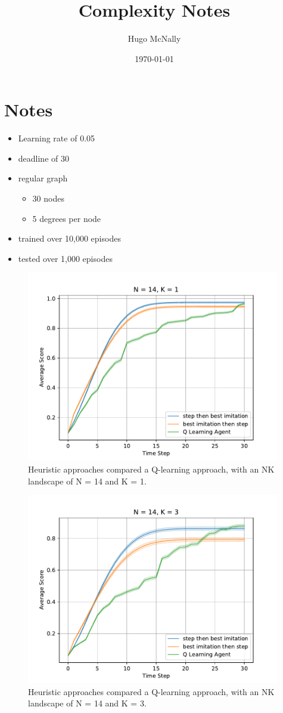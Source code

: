 \documentclass[a4paper]{article}
\title{Complexity Notes}
\date{\today}
\author{Hugo McNally}
\begin{document}
\section*{Notes}
\begin{itemize}
    \item Learning rate of 0.05
    \item deadline of 30
    \item regular graph
    \begin{itemize}
        \item 30 nodes
        \item 5 degrees per node
    \end{itemize}
    \item trained over 10,000 episodes
    \item tested over 1,000 episodes
\end{itemize}

\begin{figure}
\centering
\includegraphics[width=30em]{../figures/comp1.pdf}
\caption{
    Heuristic approaches compared a Q-learning approach,
    with an NK landscape of N = 14 and K = 1.
}
\label{comp1}
\end{figure}

\begin{figure}
\centering
\includegraphics[width=30em]{../figures/comp3.pdf}
\caption{
    Heuristic approaches compared a Q-learning approach,
    with an NK landscape of N = 14 and K = 3.
}
\label{comp3}
\end{figure}
\end{document}
